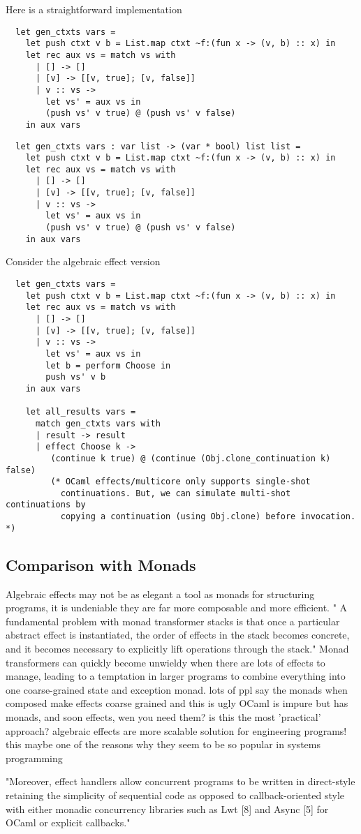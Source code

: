 Here is a straightforward implementation
\begin{verbatim}
  let gen_ctxts vars =
    let push ctxt v b = List.map ctxt ~f:(fun x -> (v, b) :: x) in
    let rec aux vs = match vs with
      | [] -> []
      | [v] -> [[v, true]; [v, false]]
      | v :: vs ->
        let vs' = aux vs in
        (push vs' v true) @ (push vs' v false)
    in aux vars
\end{verbatim}

\begin{verbatim}
  let gen_ctxts vars : var list -> (var * bool) list list =
    let push ctxt v b = List.map ctxt ~f:(fun x -> (v, b) :: x) in
    let rec aux vs = match vs with
      | [] -> []
      | [v] -> [[v, true]; [v, false]]
      | v :: vs ->
        let vs' = aux vs in
        (push vs' v true) @ (push vs' v false)
    in aux vars
\end{verbatim}
Consider the algebraic effect version

\begin{verbatim}
  let gen_ctxts vars =
    let push ctxt v b = List.map ctxt ~f:(fun x -> (v, b) :: x) in
    let rec aux vs = match vs with
      | [] -> []
      | [v] -> [[v, true]; [v, false]]
      | v :: vs ->
        let vs' = aux vs in
        let b = perform Choose in
        push vs' v b
    in aux vars

    let all_results vars =
      match gen_ctxts vars with
      | result -> result
      | effect Choose k ->
         (continue k true) @ (continue (Obj.clone_continuation k) false)
         (* OCaml effects/multicore only supports single-shot
           continuations. But, we can simulate multi-shot continuations by
           copying a continuation (using Obj.clone) before invocation. *)
\end{verbatim}

\subsection{Comparison with Monads}
Algebraic effects may not be as elegant a tool as monads
for structuring programs,
it is undeniable they are far more composable
and more efficient.
"
A fundamental problem with monad transformer stacks is that
once a particular abstract effect is instantiated,
the order of effects in the stack becomes concrete,
and it becomes necessary to explicitly lift operations
through the stack."
\cite{kammar2013handlers}
Monad transformers can quickly become unwieldy when there are lots of effects to manage,
leading to a temptation in larger programs to combine everything into one coarse-grained state and exception monad.
\cite{brady2013programming}
lots of ppl say the monads when composed make effects coarse grained
and this is ugly
OCaml is impure but has monads, and soon effects, wen you need them?
is this the most 'practical' approach?
algebraic effects are more scalable solution for engineering programs!
this maybe one of the reasons why they seem to be so popular in systems
programming


"Moreover, effect handlers allow concurrent programs to be written in direct-style retaining the simplicity of sequential code as opposed to callback-oriented style with either monadic concurrency libraries such as Lwt [8] and Async [5] for OCaml or explicit callbacks."
\cite{dolaneffectively}
